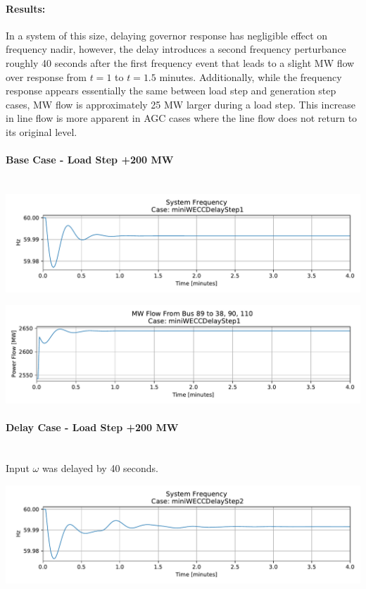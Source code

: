 \documentclass[12pt]{article}
\begin{document}
\paragraph{Results:} 
In a system of this size,
delaying governor response has negligible effect on frequency nadir, however, the delay introduces a second frequency perturbance roughly 40 seconds after the first frequency event that leads to a slight MW flow over response from $t=1$ to $t= 1.5$ minutes.
Additionally, while the frequency response appears essentially the same between load step and generation step cases, MW flow is approximately 25 MW larger during a load step.
This increase in line flow is more apparent in AGC cases where the line flow does not return to its original level.

\pagebreak
\paragraph{Base Case - Load Step +200 MW} \ \\

\includegraphics[width=\linewidth]{figures/miniWECCDelayStep1Freq}

\includegraphics[width=\linewidth]{figures/miniWECCDelayStep1MWflow89to38-90-110}

\paragraph{Delay Case - Load Step +200 MW} \ \\
Input $\omega$ was delayed by 40 seconds.

\includegraphics[width=\linewidth]{figures/miniWECCDelayStep2Freq}
\end{document}
